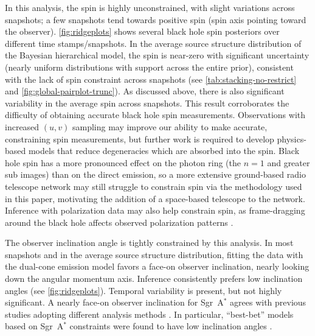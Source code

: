 \documentclass[linenumbers, twocolumn, tighten]{aastex701}
\def\sgra{Sgr~A$^*$\xspace}
\begin{document}
In this analysis, the spin is highly unconstrained, with slight variations across snapshots; a few snapshots tend towards positive spin (spin axis pointing toward the observer). \autoref{fig:ridgeplots} shows several black hole spin posteriors over different time stamps/snapshots. In the average source structure distribution of the Bayesian hierarchical model, the spin is near-zero with significant uncertainty (nearly uniform distributions with support across the entire prior), consistent with the lack of spin constraint across snapshots (see \autoref{tab:stacking-no-restrict} and \autoref{fig:global-pairplot-trunc}). As discussed above, there is also significant variability in the average spin across snapshots. This result corroborates the difficulty of obtaining accurate black hole spin measurements. Observations with increased $(u,v)$ sampling may improve our ability to make accurate, constraining spin measurements, but further work is required to develop physics-based models that reduce degeneracies which are absorbed into the spin. Black hole spin has a more pronounced effect on the photon ring (the $n=1$ and greater sub images) than on the direct emission, so a more extensive ground-based radio telescope network may still struggle to constrain spin via the methodology used in this paper, motivating the addition of a space-based telescope to the network. Inference with polarization data may also help constrain spin, as frame-dragging around the black hole affects observed polarization patterns \citep{2020ApJ...894..156P, Palumbo_2022, Chael_2023}.

The observer inclination angle is tightly constrained by this analysis. In most snapshots and in the average source structure distribution, fitting the data with the dual-cone emission model favors a face-on observer inclination, nearly looking down the angular momentum axis. Inference consistently prefers low inclination angles (see \autoref{fig:ridgeplots}). Temporal variability is present, but not highly significant. A nearly face-on observer inclination for \sgra agrees with previous studies adopting different analysis methods \citep[; see also][]{2018A&A...615L..15G}. In particular, ``best-bet'' models based on \sgra constraints were found to have low inclination angles .
\end{document}

